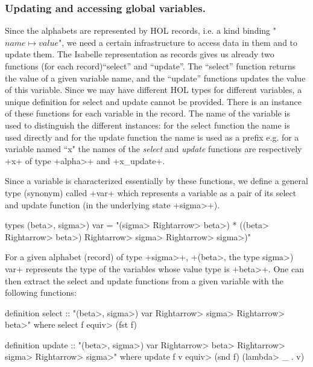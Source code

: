 \documentclass[11pt,a4paper]{article}
\begin{document}
\subsubsection{Updating and accessing global variables.}\label{sec:updating_global}
Since the alphabets are represented by HOL records, i.e. a kind binding "$name \mapsto value$",
we need a certain infrastructure to access data in them and to update them. The Isabelle 
representation as records gives us already two functions (for each record)``select'' and ``update''. 
The ``select'' function returns the value of a given variable name, and the ``update'' functions 
updates the value of this variable. Since we may have different HOL types for different variables, 
a unique definition for select and update cannot be provided. There is an instance of these 
functions for each variable in the record. The name of the variable is used to distinguish the 
different instances: for the select function the name is used directly and for the update function 
the name is used as a prefix e.g. for a variable named ``x" the names of the \emph{select} and 
\emph{update} functions are respectively \inlineisar+x+ of type \inlineisar+\<alpha>+ and 
\inlineisar+x_update+.

Since a variable is characterized essentially by these functions, we define a general type (synonym) 
called \inlineisar+var+ which represents a variable as a pair of its select and update function 
(in the underlying state \inlineisar+\<sigma>+).
\begin{isar} 
 types (\<beta>, \<sigma>) var = "(\<sigma> \<Rightarrow>  \<beta>) * ((\<beta>  \<Rightarrow> \<beta>) \<Rightarrow> \<sigma> \<Rightarrow> \<sigma>)"
\end{isar}

For a given alphabet (record) of type \inlineisar+\<sigma>+, \inlineisar+(\<beta>, the type \<sigma>) var+ represents 
the type of the variables whose value type is \inlineisar+\<beta>+. 
One can then extract the select and update functions from a given variable with the following functions:
\begin{isar}
 definition select :: "(\<beta>, \<sigma>) var \<Rightarrow>   \<sigma> \<Rightarrow> \<beta>"
   where select f \<equiv>   (fst f)

 definition update :: "(\<beta>, \<sigma>) var \<Rightarrow>    \<beta> \<Rightarrow> \<sigma> \<Rightarrow> \<sigma>"
   where update f v \<equiv>   (snd f) (\<lambda> _ . v)
\end{isar}
\end{document}
